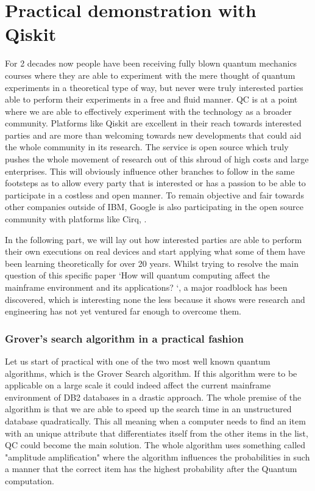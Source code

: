 
\chapter{Practical demonstration with Qiskit}
\label{ch:practical}

For 2 decades now people have been receiving fully blown quantum mechanics courses where they are able to experiment with the mere thought of quantum experiments in a theoretical type of way, but never were truly interested parties able to perform their experiments in a free and fluid manner. QC is at a point where we are able to effectively experiment with the technology as a broader community. Platforms like Qiskit are excellent in their reach towards interested parties and are more than welcoming towards new developments that could aid the whole community in its research. The service is open source which truly pushes the whole movement of research out of this shroud of high costs and large enterprises. This will obviously influence other branches to follow in the same footsteps as to allow every party that is interested or has a passion to be able to participate in a costless and open manner. To remain objective and fair towards other companies outside of IBM, Google is also participating in the open source community with platforms like Cirq, \textcite{Cirq}. 

In the following part, we will lay out how interested parties are able to perform their own executions on real devices and start applying what some of them have been learning theoretically for over 20 years. Whilst trying to resolve the main question of this specific paper `How will quantum computing affect the mainframe environment and its applications? `, a major roadblock has been discovered, which is interesting none the less because it shows were research and engineering has not yet ventured far enough to overcome them. 


\subsection{Grover's search algorithm in a practical fashion}

Let us start of practical with one of the two most well known quantum algorithms, which is the Grover Search algorithm. If this algorithm were to be applicable on a large scale it could indeed affect the current mainframe environment of DB2 databases in a drastic approach. The whole premise of the algorithm is that we are able to speed up the search time in an unstructured database quadratically. This all meaning when a computer needs to find an item with an unique attribute that differentiates itself from the other items in the list, QC could become the main solution. The whole algorithm uses something called "amplitude amplification" where the algorithm influences the probabilities in such a manner that the correct item has the highest probability after the Quantum computation. \autocite{Grover1996}

